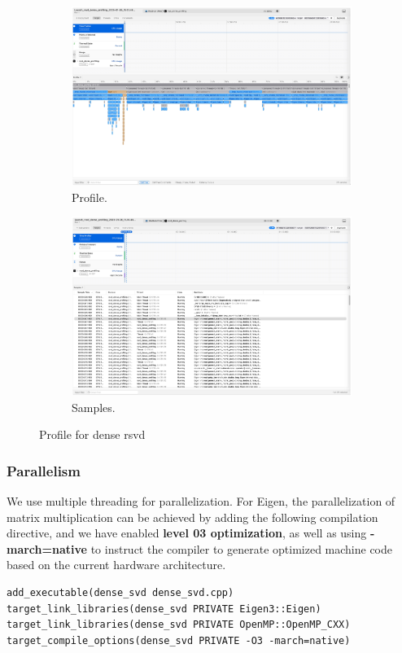 \documentclass[11pt,a4paper]{article}
\begin{document}
\begin{figure}[H]
    \centering
    \begin{subfigure}[b]{0.48\textwidth}
        \includegraphics[width=\textwidth]{Images/svd_profiling.jpg}
        \caption{Profile.}
    \end{subfigure}
    \begin{subfigure}[b]{0.48\textwidth}
        \includegraphics[width=\textwidth]{Images/svd_profiling1.jpg}
        \caption{Samples.}
    \end{subfigure}
    \caption{Profile for dense rsvd}
    \label{fig:profiler_rSVD}
\end{figure}
\subsubsection*{Parallelism}
We use multiple threading for parallelization. For Eigen, the parallelization of matrix multiplication can be achieved by adding the following compilation directive, and we have enabled \textbf{level 03 optimization}, as well as using \textbf{-march=native} to instruct the compiler to generate optimized machine code based on the current hardware architecture.
\begin{verbatim}
add_executable(dense_svd dense_svd.cpp)
target_link_libraries(dense_svd PRIVATE Eigen3::Eigen)
target_link_libraries(dense_svd PRIVATE OpenMP::OpenMP_CXX)
target_compile_options(dense_svd PRIVATE -O3 -march=native)
\end{verbatim}
\end{document}
